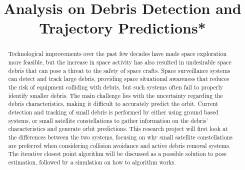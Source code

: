 \documentclass[conference]{IEEEtran}
\begin{document}
	
	\title{Analysis on Debris Detection and Trajectory Predictions*}

	\author{
	}

	\maketitle
	
	
	\begin{abstract}
		
		Technological improvements over the past few decades have made space exploration more feasible, but the increase in space activity has also resulted in undesirable space debris that can pose a threat to the safety of space crafts. 
		Space surveillance systems can detect and track large debris, providing space situational awareness that reduces the risk of equipment colliding with debris, but such systems often fail to properly identify smaller debris. The main challenge lies with the uncertainty regarding the debris characteristics, making it difficult to accurately predict the orbit.
		Current detection and tracking of small debris is performed by either using ground based systems, or small satellite constellations to gather information on the debris' characteristics and generate orbit predictions.
		This research project will first look at the differences between the two systems, focusing on why small satellite constellations are preferred when considering collision avoidance and active debris removal systems. The iterative closest point algorithm will be discussed as a possible solution to pose estimation, followed by a simulation on how to algorithm works.
		

	\end{abstract}

\end{document}
